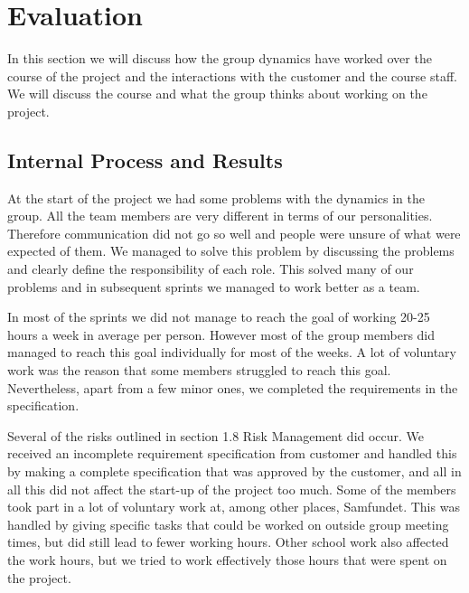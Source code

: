 \section{Evaluation}

In this section we will discuss how the group dynamics have worked over the
course of the project and the interactions with the customer and the course
staff. We will discuss the course and what the group thinks about working on the
project.

\subsection{Internal Process and Results}


	At the start of the project we had some problems with the dynamics in the group. 
	All the team members are very different in terms of our personalities. Therefore communication 
	did not go so well and people were unsure of what were expected of them. We managed to solve 
	this problem by discussing the problems and clearly define the responsibility of each role. 
	This solved many of our problems and in subsequent sprints we managed to work better 
	as a team.

	In most of the sprints we did not manage to reach the goal of working 20-25 hours a week in 
	average per person. However most of the group members did managed to reach this goal individually 
	for most of the weeks. A lot of voluntary work was the reason that some members struggled to reach 
	this goal. Nevertheless, apart from a few minor ones, we completed the requirements in the specification.

	Several of the risks outlined in section 1.8 Risk Management did occur. We received an incomplete 
	requirement specification from customer and handled this by making a complete specification that 
	was approved by the customer, and all in all this did not affect the start-up of the project too much. 
	Some of the members took part in a lot of voluntary work at, among other places, Samfundet. This was handled 
	by giving specific tasks that could be worked on outside group meeting times, but did still lead to fewer 
	working hours. Other school work also affected the work hours, but we tried to work effectively those hours 
	that were spent on the project.


